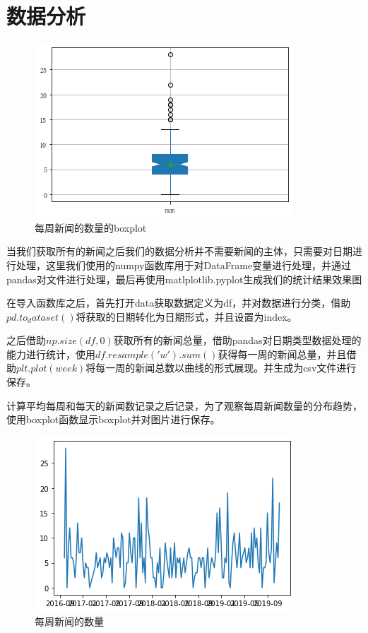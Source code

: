 \documentclass[12pt]{article}
\begin{document}
	\section{数据分析}
	\begin{figure}[htb]
		
		\centering
		\includegraphics[scale=0.6]{boxplot.png}
		\caption{每周新闻的数量的boxplot}
	\end{figure}
	当我们获取所有的新闻之后我们的数据分析并不需要新闻的主体，只需要对日期进行处理，这里我们使用的numpy函数库用于对DataFrame变量进行处理，并通过pandas对文件进行处理，最后再使用matlplotlib.pyplot生成我们的统计结果效果图
	
	在导入函数库之后，首先打开data获取数据定义为df，并对数据进行分类，借助$pd.to_dataset()$将获取的日期转化为日期形式，并且设置为index。

	之后借助$np.size(df,0)$获取所有的新闻总量，借助pandas对日期类型数据处理的能力进行统计，使用$df.resample('w').sum()$获得每一周的新闻总量，并且借助$plt.plot(week)$将每一周的新闻总数以曲线的形式展现。并生成为csv文件进行保存。
	

	计算平均每周和每天的新闻数记录之后记录，为了观察每周新闻数量的分布趋势，使用boxplot函数显示boxplot并对图片进行保存。
	\begin{figure}[htb]
			\centering
			\includegraphics[scale=0.6]{eachweeknews.png}
			\caption{每周新闻的数量}
	\end{figure}
\end{document}
